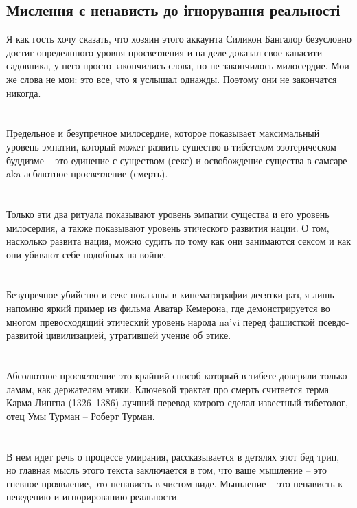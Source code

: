 \subsection{Мислення є ненависть до ігнорування реальності}

Я как гость хочу сказать, что хозяин этого аккаунта Силикон Бангалор безусловно достиг определнного уровня просветления и на деле доказал свое капасити садовника, у него просто закончились слова, но не закончилось милосердие. Мои же слова не мои: это все, что я услышал однажды. Поэтому они не закончатся никогда.\\
\\
\\
Предельное и безупречное милосердие, которое показывает максимальный уровень эмпатии, который может развить существо в тибетском эзотерическом буддизме -- это единение с существом (секс) и освобождение существа в самсаре aka асблютное просветление (смерть).\\
\\
\\
Только эти два ритуала показывают уровень эмпатии существа и его уровень милосердия, а также показывают уровень этического развития нации. О том, насколько развита нация, можно судить по тому как они занимаются сексом и как они убивают себе подобных на войне.\\
\\
\\
Безупречное убийство и секс показаны в кинематографии десятки раз, я лишь напомню яркий пример из фильма Аватар Кемерона, где демонстрируется во многом превосходящий этический уровень народа na'vi перед фашисткой псевдо-развитой цивилизацией, утратившей учение об этике.\\
\\
\\
Абсолютное просветление это крайний способ который в тибете доверяли только ламам, как держателям этики. Ключевой трактат про смерть считается терма Карма Лингпа (1326–1386) лучший перевод котрого сделал известный тибетолог, отец Умы Турман -- Роберт Турман.\\
\\
\\
В нем идет речь о процессе умирания, рассказывается в детялях этот бед трип, но главная мысль этого текста заключается в том, что ваше мышление -- это гневное проявление, это ненависть в чистом виде. Мышление -- это ненависть к неведению и игнорированию реальности.\\
\\
